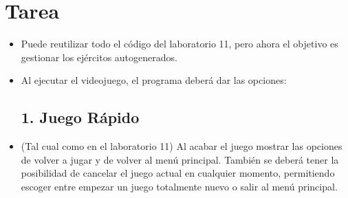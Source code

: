 \documentclass{article}
\begin{document}
	\section{Tarea}
	\begin{itemize}
			\item Puede reutilizar todo el código del laboratorio 11, pero ahora el objetivo es gestionar los ejércitos autogenerados.
			\item Al ejecutar el videojuego, el programa deberá dar las opciones:
	\subsection{1. Juego Rápido}
			\item (Tal cual como en el laboratorio 11) Al acabar el juego mostrar las opciones de volver a jugar y de volver al menú principal. También se deberá tener la posibilidad de cancelar el juego actual en cualquier momento, permitiendo escoger entre empezar un juego totalmente nuevo o salir al menú principal.

\end{itemize}
\end{document}
